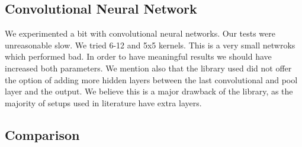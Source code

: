 \subsection{Convolutional Neural Network}
We experimented a bit with convolutional neural networks. Our tests were unreasonable slow. We tried 6-12 and 5x5 kernels. This is a  very small netwroks which performed bad. In order to have meaningful results we should have increased both parameters. We mention also that the library used did not offer the option of adding more hidden layers between the last convolutional and pool layer and the output. We believe this is a major drawback of the library, as the majority of setups used in literature have extra layers.
\subsection{Comparison}